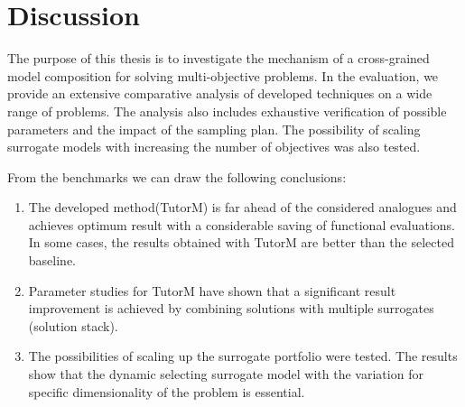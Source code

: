 







\section{Discussion}

The purpose of this thesis is to investigate the mechanism of a cross-grained model composition for solving multi-objective problems. In the evaluation, we provide an extensive comparative analysis of developed techniques on a wide range of problems. The analysis also includes exhaustive verification of possible parameters and the impact of the sampling plan. The possibility of scaling surrogate models with increasing the number of objectives was also tested.

From the benchmarks we can draw the following conclusions:
\begin{enumerate}
    \item The developed method(TutorM) is far ahead of the considered analogues and achieves optimum result with a considerable saving of functional evaluations. In some cases, the results obtained with TutorM are better than the selected baseline.
    \item Parameter studies for TutorM have shown that a significant result improvement is achieved by combining solutions with multiple surrogates (solution stack).
    \item The possibilities of scaling up the surrogate portfolio were tested. The results show that the dynamic selecting surrogate model with the variation for specific dimensionality of the problem is essential.
\end{enumerate}






